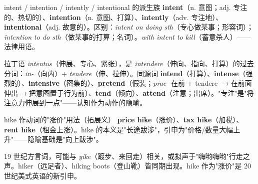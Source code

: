 \documentclass[../main.tex]{subfiles}
\begin{document}


\begin{lex}{intent / intention / intently / intentional 的派生族}
\textbf{intent}（n. 意图；adj. 专注的、热切的）、\textbf{intention}（n. 意图、打算）、\textbf{intently}（adv. 专注地）、\textbf{intentional}（adj. 故意的）。区别：\textit{intent on doing sth}（专心做某事；形容词）；\textit{intention to do sth}（做某事的打算；名词）。\textit{with intent to kill}（蓄意杀人）——法律用语。
\end{lex}

\begin{origin}
拉丁语 \textit{intentus}（伸展、专心、紧张），是 \textit{intendere}（伸向、指向、打算）的过去分词：\textit{in-}（向内）+ \textit{tendere}（伸、拉伸）。同源词 \textbf{intend}（打算）、\textbf{intense}（强烈的）、\textbf{intensive}（密集的）、\textbf{pretend}（假装；\textit{prae-} 在前 + tendere $\to$在前面伸出$\to$把意图置于行为前）、\textbf{tend}（倾向）、\textbf{attend}（注意；出席）。"专注"是"将注意力伸展到一点"——认知作为动作的隐喻。
\end{origin}




\begin{gram}{hike 作动词的"涨价"用法（拓展义）}
\textbf{price hike}（涨价）、\textbf{tax hike}（加税）、\textbf{rent hike}（租金上涨）。hike 的本义是"长途跋涉"，引申为"价格/数量大幅上升"——隐喻基础是"向上跋涉"。
\end{gram}

\begin{origin}
19 世纪方言词，可能与 \textit{yike}（踱步、来回走）相关，或拟声于"嗨哟嗨哟"行走之声。hiker（远足者）、hiking boots（登山靴）皆同期出现。hike 作为"涨价"是 20 世纪美式英语的新引申。
\end{origin}
\end{document}
